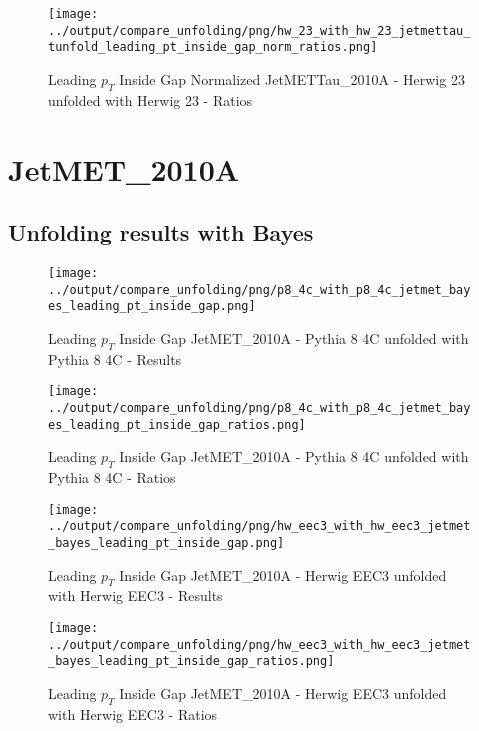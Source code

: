 \documentclass[11pt]{book}
\begin{document}
\begin{figure}[ht]
\centering
\texttt{[image: ../output/compare\_unfolding/png/hw\_23\_with\_hw\_23\_jetmettau\_tunfold\_leading\_pt\_inside\_gap\_norm\_ratios.png]}
\caption{Leading $p_{T}$ Inside Gap Normalized JetMETTau\_2010A - Herwig 23 unfolded with Herwig 23 - Ratios}
\label{hw_23_hw_23_jetmettau_tunfold_leading_pt_inside_gap_norm_b}
\end{figure}


\clearpage
\section{JetMET\_2010A}
\subsection{Unfolding results with Bayes}

\begin{figure}[ht]
\centering
\texttt{[image: ../output/compare\_unfolding/png/p8\_4c\_with\_p8\_4c\_jetmet\_bayes\_leading\_pt\_inside\_gap.png]}
\caption{Leading $p_{T}$ Inside Gap JetMET\_2010A - Pythia 8 4C unfolded with Pythia 8 4C - Results}
\label{p8_p8_jetmet_bayes_leading_pt_inside_gap_a}
\end{figure}

\begin{figure}[ht]
\centering
\texttt{[image: ../output/compare\_unfolding/png/p8\_4c\_with\_p8\_4c\_jetmet\_bayes\_leading\_pt\_inside\_gap\_ratios.png]}
\caption{Leading $p_{T}$ Inside Gap JetMET\_2010A - Pythia 8 4C unfolded with Pythia 8 4C - Ratios}
\label{p8_p8_jetmet_bayes_leading_pt_inside_gap_b}
\end{figure}

\begin{figure}[ht]
\centering
\texttt{[image: ../output/compare\_unfolding/png/hw\_eec3\_with\_hw\_eec3\_jetmet\_bayes\_leading\_pt\_inside\_gap.png]}
\caption{Leading $p_{T}$ Inside Gap JetMET\_2010A - Herwig EEC3 unfolded with Herwig EEC3 - Results}
\label{hw_eec3_hw_eec3_jetmet_bayes_leading_pt_inside_gap_a}
\end{figure}

\begin{figure}[ht]
\centering
\texttt{[image: ../output/compare\_unfolding/png/hw\_eec3\_with\_hw\_eec3\_jetmet\_bayes\_leading\_pt\_inside\_gap\_ratios.png]}
\caption{Leading $p_{T}$ Inside Gap JetMET\_2010A - Herwig EEC3 unfolded with Herwig EEC3 - Ratios}
\label{hw_eec3_hw_eec3_jetmet_bayes_leading_pt_inside_gap_b}
\end{figure}
\end{document}
